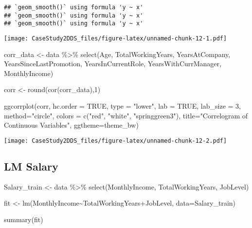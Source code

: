 \documentclass[
]{article}
\newenvironment{Shaded}{\begin{snugshade}}{\end{snugshade}}
\newcommand{\AttributeTok}[1]{\textcolor[rgb]{0.77,0.63,0.00}{#1}}
\newcommand{\ConstantTok}[1]{\textcolor[rgb]{0.00,0.00,0.00}{#1}}
\newcommand{\DecValTok}[1]{\textcolor[rgb]{0.00,0.00,0.81}{#1}}
\newcommand{\FunctionTok}[1]{\textcolor[rgb]{0.00,0.00,0.00}{#1}}
\newcommand{\NormalTok}[1]{#1}
\newcommand{\OtherTok}[1]{\textcolor[rgb]{0.56,0.35,0.01}{#1}}
\newcommand{\SpecialCharTok}[1]{\textcolor[rgb]{0.00,0.00,0.00}{#1}}
\newcommand{\StringTok}[1]{\textcolor[rgb]{0.31,0.60,0.02}{#1}}
\begin{document}
\begin{verbatim}
## `geom_smooth()` using formula 'y ~ x'
## `geom_smooth()` using formula 'y ~ x'
## `geom_smooth()` using formula 'y ~ x'
\end{verbatim}

\texttt{[image: CaseStudy2DDS\_files/figure-latex/unnamed-chunk-12-1.pdf]}

\begin{Shaded}
\begin{Highlighting}[]
\NormalTok{corr\_data }\OtherTok{\textless{}{-}}\NormalTok{ data }\SpecialCharTok{\%\textgreater{}\%} \FunctionTok{select}\NormalTok{(Age, TotalWorkingYears, YearsAtCompany, YearsSinceLastPromotion, YearsInCurrentRole, YearsWithCurrManager, MonthlyIncome)}

\NormalTok{corr }\OtherTok{\textless{}{-}} \FunctionTok{round}\NormalTok{(}\FunctionTok{cor}\NormalTok{(corr\_data),}\DecValTok{1}\NormalTok{)}

\FunctionTok{ggcorrplot}\NormalTok{(corr, }\AttributeTok{hc.order =} \ConstantTok{TRUE}\NormalTok{, }
           \AttributeTok{type =} \StringTok{"lower"}\NormalTok{, }
           \AttributeTok{lab =} \ConstantTok{TRUE}\NormalTok{, }
           \AttributeTok{lab\_size =} \DecValTok{3}\NormalTok{, }
           \AttributeTok{method=}\StringTok{"circle"}\NormalTok{, }
           \AttributeTok{colors =} \FunctionTok{c}\NormalTok{(}\StringTok{"red"}\NormalTok{, }\StringTok{"white"}\NormalTok{, }\StringTok{"springgreen3"}\NormalTok{), }
           \AttributeTok{title=}\StringTok{"Correlogram of Continuous Variables"}\NormalTok{, }
           \AttributeTok{ggtheme=}\NormalTok{theme\_bw)}
\end{Highlighting}
\end{Shaded}

\texttt{[image: CaseStudy2DDS\_files/figure-latex/unnamed-chunk-12-2.pdf]}

\hypertarget{lm-salary}{%
\subsection{LM Salary}\label{lm-salary}}

\begin{Shaded}
\begin{Highlighting}[]
\NormalTok{Salary\_train }\OtherTok{\textless{}{-}}\NormalTok{ data }\SpecialCharTok{\%\textgreater{}\%} \FunctionTok{select}\NormalTok{(MonthlyIncome, TotalWorkingYears, JobLevel)}

\NormalTok{fit }\OtherTok{\textless{}{-}} \FunctionTok{lm}\NormalTok{(MonthlyIncome}\SpecialCharTok{\textasciitilde{}}\NormalTok{TotalWorkingYears}\SpecialCharTok{+}\NormalTok{JobLevel, }\AttributeTok{data=}\NormalTok{Salary\_train)}

\FunctionTok{summary}\NormalTok{(fit)}
\end{Highlighting}
\end{Shaded}
\end{document}
